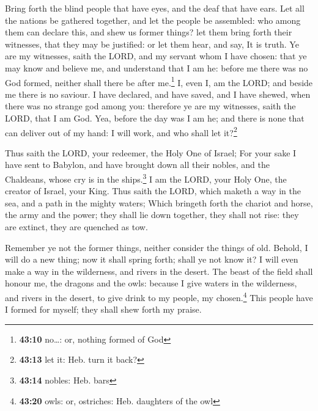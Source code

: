  Bring forth the blind people that have eyes, and the deaf
that have ears.  Let all the nations be gathered together,
and let the people be assembled: who among them can declare this, and
shew us former things? let them bring forth their witnesses, that they
may be justified: or let them hear, and say, It is truth.
 Ye are my witnesses, saith the LORD, and my servant whom
I have chosen: that ye may know and believe me, and understand that I am
he: before me there was no God formed, neither shall there be after
me.\footnote{\textbf{43:10} no\ldots: or, nothing formed of God}
 I, even I, am the LORD; and beside me there is no
saviour.  I have declared, and have saved, and I have
shewed, when there was no strange god among you: therefore ye are my
witnesses, saith the LORD, that I am God.  Yea, before
the day was I am he; and there is none that can deliver out of my hand:
I will work, and who shall let it?\footnote{\textbf{43:13} let it: Heb.
  turn it back?}

 Thus saith the LORD, your redeemer, the Holy One of
Israel; For your sake I have sent to Babylon, and have brought down all
their nobles, and the Chaldeans, whose cry is in the ships.\footnote{\textbf{43:14}
  nobles: Heb. bars}  I am the LORD, your Holy One, the
creator of Israel, your King.  Thus saith the LORD, which
maketh a way in the sea, and a path in the mighty waters;
 Which bringeth forth the chariot and horse, the army and
the power; they shall lie down together, they shall not rise: they are
extinct, they are quenched as tow.

 Remember ye not the former things, neither consider the
things of old.  Behold, I will do a new thing; now it
shall spring forth; shall ye not know it? I will even make a way in the
wilderness, and rivers in the desert.  The beast of the
field shall honour me, the dragons and the owls: because I give waters
in the wilderness, and rivers in the desert, to give drink to my people,
my chosen.\footnote{\textbf{43:20} owls: or, ostriches: Heb. daughters
  of the owl}  This people have I formed for myself; they
shall shew forth my praise.

